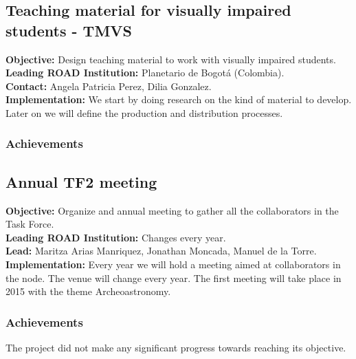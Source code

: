 


\subsection{Teaching material for visually impaired students - TMVS}
\textbf{Objective:} Design teaching material to work with visually impaired students.
\\
\textbf{Leading ROAD Institution:} Planetario de Bogotá (Colombia).
\\
\textbf{Contact:} Angela Patricia Perez, Dilia Gonzalez.
\\
\textbf{Implementation:} We start by doing research on the kind of
material to develop. Later on we will define the production and
distribution processes. 


\subsubsection{Achievements}



\subsection{Annual TF2 meeting}
\textbf{Objective:} Organize and annual meeting to gather all the collaborators in the Task Force.
\\
\textbf{Leading ROAD Institution:} Changes every year.
\\
\textbf{Lead:} Maritza Arias Manriquez, Jonathan Moncada, Manuel de la Torre.
\\
\textbf{Implementation:} Every year we will hold a meeting aimed at collaborators in the node. The venue will change every year. The first meeting will take place in 2015 with the theme Archeoastronomy.

\subsubsection{Achievements}

The project did not make any significant progress towards reaching its
objective.

